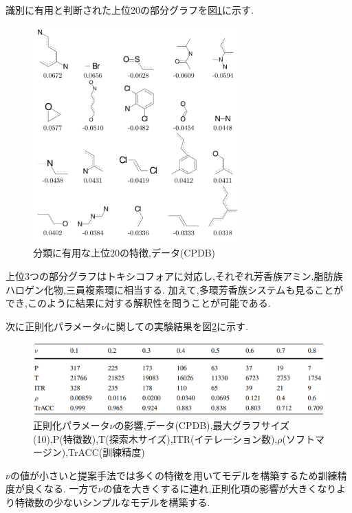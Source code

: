 \documentclass{zasshi-prml3}
\theoremstyle{definition}
\begin{document}
{識別に有用と判断された上位20の部分グラフを図\ref{top20features}に示す.
\begin{figure}[t]
	\centering
	\includegraphics[width=80mm]{figure/top20features.png}
	\caption{分類に有用な上位20の特徴,データ(CPDB)}
	\label{top20features}
\end{figure}
上位3つの部分グラフはトキシコフォアに対応し,それぞれ芳香族アミン,脂肪族ハロゲン化物,三員複素環に相当する.
加えて,多環芳香族システムも見ることができ,このように結果に対する解釈性を問うことが可能である.

次に正則化パラメータ$\nu$に関しての実験結果を図\ref{nu_parameter}に示す.
\begin{figure}[t]
	\centering
	\includegraphics[width=150mm]{figure/nu_parameter.png}
	\caption{正則化パラメータ$\nu$の影響,データ(CPDB),最大グラフサイズ(10),P(特徴数),T(探索木サイズ),ITR(イテレーション数),$\rho$(ソフトマージン),TrACC(訓練精度)}
	\label{nu_parameter}
\end{figure}
$\nu$の値が小さいと提案手法では多くの特徴を用いてモデルを構築するため訓練精度が良くなる.
一方で$\nu$の値を大きくするに連れ,正則化項の影響が大きくなりより特徴数の少ないシンプルなモデルを構築する.

}
\end{document}
